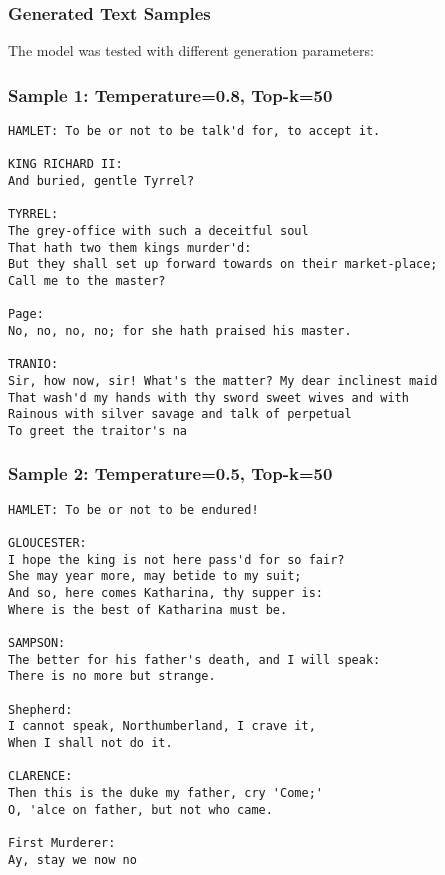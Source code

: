 \subsubsection*{Generated Text Samples}
The model was tested with different generation parameters:

\subsubsection*{Sample 1: Temperature=0.8, Top-k=50}
\begin{verbatim}
HAMLET: To be or not to be talk'd for, to accept it.

KING RICHARD II:
And buried, gentle Tyrrel?

TYRREL:
The grey-office with such a deceitful soul
That hath two them kings murder'd:
But they shall set up forward towards on their market-place;
Call me to the master?

Page:
No, no, no, no; for she hath praised his master.

TRANIO:
Sir, how now, sir! What's the matter? My dear inclinest maid
That wash'd my hands with thy sword sweet wives and with
Rainous with silver savage and talk of perpetual
To greet the traitor's na
\end{verbatim}

\subsubsection*{Sample 2: Temperature=0.5, Top-k=50}
\begin{verbatim}
HAMLET: To be or not to be endured!

GLOUCESTER:
I hope the king is not here pass'd for so fair?
She may year more, may betide to my suit;
And so, here comes Katharina, thy supper is:
Where is the best of Katharina must be.

SAMPSON:
The better for his father's death, and I will speak:
There is no more but strange.

Shepherd:
I cannot speak, Northumberland, I crave it,
When I shall not do it.

CLARENCE:
Then this is the duke my father, cry 'Come;'
O, 'alce on father, but not who came.

First Murderer:
Ay, stay we now no 
\end{verbatim}

